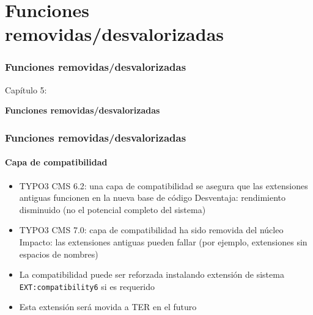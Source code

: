 %

\section{Funciones removidas/desvalorizadas}
\begin{frame}[fragile]
	\frametitle{Funciones removidas/desvalorizadas}

	\begin{center}\huge{Capítulo 5:}\end{center}
	\begin{center}\huge{\color{typo3darkgrey}\textbf{Funciones removidas/desvalorizadas}}\end{center}

\end{frame}


\begin{frame}[fragile]
	\frametitle{Funciones removidas/desvalorizadas}
	\framesubtitle{Capa de compatibilidad}

	\begin{itemize}

		\item TYPO3 CMS 6.2: una capa de compatibilidad se asegura que las extensiones antiguas funcionen en la nueva base de código\newline
			\small
				Desventaja: rendimiento disminuido (no el potencial completo del sistema)
			\normalsize

		\item TYPO3 CMS 7.0: capa de compatibilidad ha sido removida del núcleo\newline
			\small
				Impacto: las extensiones antiguas pueden fallar (por ejemplo, extensiones sin espacios de nombres)
			\normalsize

		\item La compatibilidad puede ser reforzada instalando extensión de sistema \texttt{EXT:compatibility6} si es requerido
		\item Esta extensión será movida a TER en el futuro

	\end{itemize}

\end{frame}

